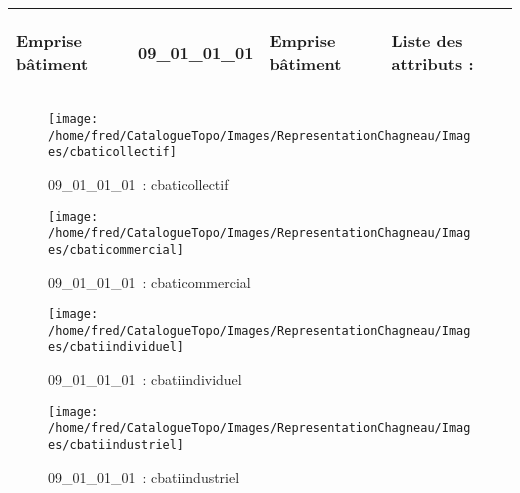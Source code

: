 \documentclass[12pt,titlepage]{book}
\begin{document}
\renewcommand{\arraystretch}{1.2}
\begin{supertabular}{|p{10cm}|c|p{13cm}|p{12cm}|}
 Emprise bâtiment & 09\_01\_01\_01 & Emprise bâtiment & Liste des attributs :
\begin{enumerate}
\end{enumerate}
\\
\hline
\end{supertabular}
\begin{figure}[h!]
  \hfill         %
  \begin{minipage}[t]{3cm}
    \begin{center}
      \texttt{[image: /home/fred/CatalogueTopo/Images/RepresentationChagneau/Images/cbaticollectif]}
      \caption[~09\_01\_01\_01]{\small{09\_01\_01\_01~:} \tiny{cbaticollectif}}\label{cbaticollectif}
    \end{center}
  \end{minipage}
  \begin{minipage}[t]{3cm}
    \begin{center}
      \texttt{[image: /home/fred/CatalogueTopo/Images/RepresentationChagneau/Images/cbaticommercial]}
      \caption[~09\_01\_01\_01]{\small{09\_01\_01\_01~:} \tiny{cbaticommercial}}\label{cbaticommercial}
    \end{center}
  \end{minipage}
  \begin{minipage}[t]{3cm}
    \begin{center}
      \texttt{[image: /home/fred/CatalogueTopo/Images/RepresentationChagneau/Images/cbatiindividuel]}
      \caption[~09\_01\_01\_01]{\small{09\_01\_01\_01~:} \tiny{cbatiindividuel}}\label{cbatiindividuel}
    \end{center}
  \end{minipage}
  \begin{minipage}[t]{3cm}
    \begin{center}
      \texttt{[image: /home/fred/CatalogueTopo/Images/RepresentationChagneau/Images/cbatiindustriel]}
      \caption[~09\_01\_01\_01]{\small{09\_01\_01\_01~:} \tiny{cbatiindustriel}}\label{cbatiindustriel}
    \end{center}
  \end{minipage}
  \begin{minipage}[t]{3cm}

\end{minipage}
\end{figure}
\end{document}
